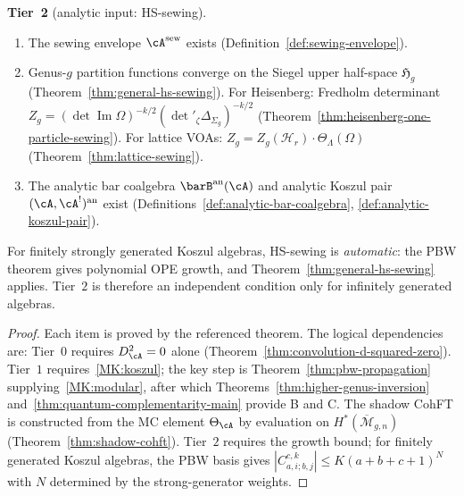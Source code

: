 \begin{theorem}
\smallskip\noindent
\textbf{Tier~2} \textup{(analytic input: HS-sewing)}.
\begin{enumerate}[label=\textup{(2.\arabic*)}]
\item The sewing envelope $\cA^{\mathrm{sew}}$ exists
  \textup{(Definition~\ref{def:sewing-envelope})}.
\item Genus-$g$ partition functions converge on the
  Siegel upper half-space $\mathfrak{H}_g$
  \textup{(Theorem~\ref{thm:general-hs-sewing})}.
  For Heisenberg: Fredholm determinant
  $Z_g = (\det\operatorname{Im}\Omega)^{-k/2}
  (\det'_\zeta\Delta_{\Sigma_g})^{-k/2}$
  \textup{(Theorem~\ref{thm:heisenberg-one-particle-sewing})}.
  For lattice VOAs:
  $Z_g = Z_g(\mathcal{H}_r) \cdot
  \Theta_\Lambda(\Omega)$
  \textup{(Theorem~\ref{thm:lattice-sewing})}.
\item The analytic bar coalgebra
  $\barB^{\mathrm{an}}(\cA)$ and analytic Koszul
  pair $(\cA, \cA^!)^{\mathrm{an}}$ exist
  \textup{(Definitions~\ref{def:analytic-bar-coalgebra},
  \ref{def:analytic-koszul-pair})}.
\end{enumerate}
For finitely strongly generated Koszul algebras,
HS-sewing is \emph{automatic}: the PBW theorem gives
polynomial OPE growth, and
Theorem~\textup{\ref{thm:general-hs-sewing}} applies.
Tier~$2$ is therefore an independent condition only
for infinitely generated algebras.
\end{theorem}

\begin{proof}
Each item is proved by the referenced theorem.  The
logical dependencies are:
Tier~$0$ requires $D_\cA^2 = 0$ alone
(Theorem~\ref{thm:convolution-d-squared-zero}).
Tier~$1$ requires~\ref{MK:koszul}; the key step
is Theorem~\ref{thm:pbw-propagation} supplying~\ref{MK:modular},
after which Theorems~\ref{thm:higher-genus-inversion}
and~\ref{thm:quantum-complementarity-main} provide B and C.
The shadow CohFT is constructed from the MC element
$\Theta_\cA$ by evaluation on
$H^*(\overline{\mathcal{M}}_{g,n})$
(Theorem~\ref{thm:shadow-cohft}).
Tier~$2$ requires the growth bound; for finitely
generated Koszul algebras, the PBW basis gives
$|C^{c,k}_{a,i;b,j}| \leq K(a{+}b{+}c{+}1)^N$ with
$N$ determined by the strong-generator weights.
\end{proof}


